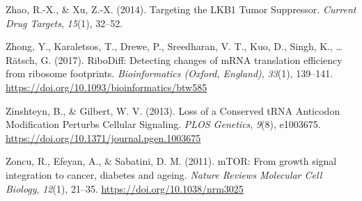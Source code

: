 \documentclass[12pt,openany]{book}
\begin{document}
\hypertarget{ref-Zhao2014}{}
Zhao, R.-X., \& Xu, Z.-X. (2014). Targeting the LKB1 Tumor Suppressor.
\emph{Current Drug Targets}, \emph{15}(1), 32--52.

\hypertarget{ref-Zhong2017}{}
Zhong, Y., Karaletsos, T., Drewe, P., Sreedharan, V. T., Kuo, D., Singh,
K., \ldots{} Rätsch, G. (2017). RiboDiff: Detecting changes of mRNA
translation efficiency from ribosome footprints. \emph{Bioinformatics
(Oxford, England)}, \emph{33}(1), 139--141.
\url{https://doi.org/10.1093/bioinformatics/btw585}

\hypertarget{ref-Zinshteyn2013}{}
Zinshteyn, B., \& Gilbert, W. V. (2013). Loss of a Conserved tRNA
Anticodon Modification Perturbs Cellular Signaling. \emph{PLOS
Genetics}, \emph{9}(8), e1003675.
\url{https://doi.org/10.1371/journal.pgen.1003675}

\hypertarget{ref-Zoncu2011}{}
Zoncu, R., Efeyan, A., \& Sabatini, D. M. (2011). mTOR: From growth
signal integration to cancer, diabetes and ageing. \emph{Nature Reviews
Molecular Cell Biology}, \emph{12}(1), 21--35.
\url{https://doi.org/10.1038/nrm3025}
\end{document}
